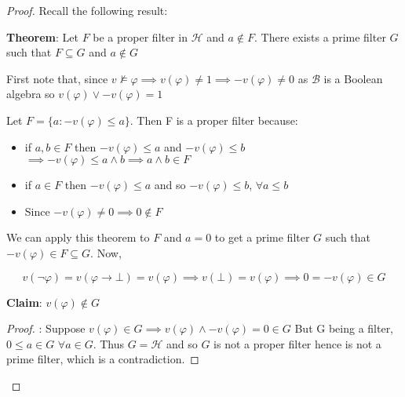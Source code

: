 \documentclass[12pt]{article}
\begin{document}
\begin{proof}
Recall the following result:

\textbf{Theorem}: Let $F$ be a proper filter in $\mathcal{H}$ and $a \not \in F$. There exists a prime filter $G$ such that $F \subseteq G$ and $a \not \in G$

First note that, since $v \not \models \varphi \implies v(\varphi) \neq 1 \implies -v(\varphi) \neq 0$ as $\mathcal{B}$ is a Boolean algebra so $v(\varphi) \vee -v(\varphi) = 1$

Let $F = \{a : -v(\varphi) \leq a\}$. Then F is a proper filter because:
\begin{itemize}
    \item if $a,b \in F$ then $-v(\varphi) \leq a$ and $-v(\varphi) \leq b$ $\implies -v(\varphi) \leq a \wedge b \implies a \wedge b \in F$
    \item if $a \in F$ then $-v(\varphi) \leq a$ and so $-v(\varphi) \leq b$, $\forall a \leq b$
    \item Since $-v(\varphi) \neq 0 \implies 0 \not \in F$
\end{itemize}

We can apply this theorem to $F$ and $a = 0$ to get a prime filter $G$ such that $-v(\varphi) \in F \subseteq G$. Now,

$$v(\neg \varphi) = v(\varphi \rightarrow \bot) = v(\varphi) \implies v(\bot) = v(\varphi) \implies 0 = -v(\varphi) \in G$$

\textbf{Claim}: $v(\varphi) \not \in G$
\begin{proof}: Suppose $v(\varphi) \in G \implies v(\varphi) \wedge -v(\varphi) = 0 \in G$ But G being a filter, $0 \leq a \in G$ $\forall a \in G$. Thus $G = \mathcal{H}$ and so $G$ is not a proper filter hence is not a prime filter, which is a contradiction.
\end{proof}


\end{proof}
\end{document}
